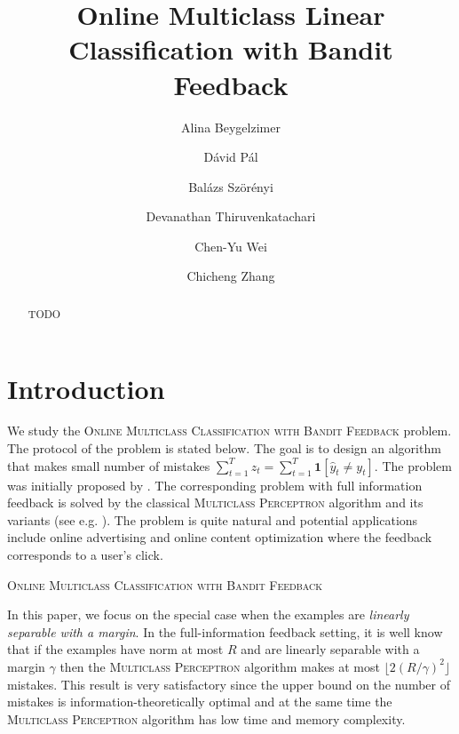 \documentclass[12pt]{article}
\title{Online Multiclass Linear Classification with Bandit Feedback}
\author{
Alina Beygelzimer \and
D\'avid P\'al \and
Bal\'azs Sz\"or\'enyi \and
Devanathan Thiruvenkatachari \and
Chen-Yu Wei \and
Chicheng Zhang
}
\newcommand{\indicator}[1]{\mathbf{1}\left[#1 \right]} %
\begin{document}
\maketitle

\begin{abstract}
TODO
\end{abstract}

\section{Introduction}
\label{section:introduction}

We study the \textsc{Online Multiclass Classification with Bandit Feedback}
problem. The protocol of the problem is stated below. The goal is to design an
algorithm that makes small number of mistakes $\sum_{t=1}^T z_t = \sum_{t=1}^T
\indicator{\widehat y_t \neq y_t}$. The problem was initially proposed by
\cite{Kakade-Shalev-Shwartz-Tewari-2008}. The corresponding problem with full
information feedback is solved by the classical \textsc{Multiclass Perceptron}
algorithm and its variants (see e.g.
\cite{Crammer-Dekel-Keshet-Shalev-Shwartz-Singer-2006}). The problem is quite
natural and potential applications include online advertising and online content
optimization where the feedback corresponds to a user's click.

\begin{algorithm}[h]
\caption{\textsc{Online Multiclass Classification with Bandit Feedback}
\label{algorithm:game-protocol}}
\begin{algorithmic}[1]
{
\ENDFOR
}
\end{algorithmic}
\end{algorithm}

In this paper, we focus on the special case when the examples are \emph{linearly
separable with a margin}. In the full-information feedback setting, it is well
know that if the examples have norm at most $R$ and are linearly separable with
a margin $\gamma$ then the \textsc{Multiclass Perceptron} algorithm makes at
most $\lfloor 2(R/\gamma)^2 \rfloor$ mistakes. This result is very satisfactory
since the upper bound on the number of mistakes is information-theoretically
optimal and at the same time the \textsc{Multiclass Perceptron} algorithm has
low time and memory complexity.
\end{document}
